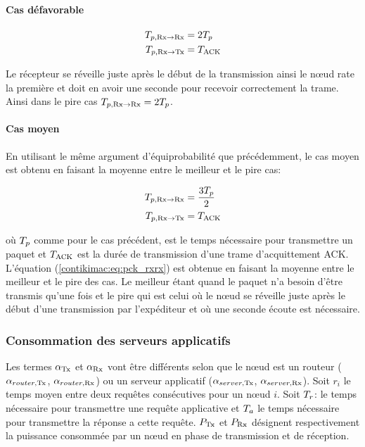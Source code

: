 \paragraph{Cas défavorable}

\begin{align}
  T_{p, \textrm{Rx} \to \textrm{Rx}} &= 2T_p
  \label{contikimac:eq:pck_rxrx_worst} \\
  T_{p, \textrm{Rx} \to \textrm{Tx}} &= T_{\textrm{ACK}}
  \label{contikimac:eq:pck_rxtx_worst}
\end{align}

Le récepteur se réveille juste après le début de la transmission ainsi le nœud rate la première et doit en avoir une seconde pour recevoir correctement la trame.
Ainsi dans le pire cas $T_{p, \textrm{Rx} \to \textrm{Rx}} = 2T_p$.

\paragraph{Cas moyen}

En utilisant le même argument d'équiprobabilité que précédemment, le cas moyen est obtenu en faisant la moyenne entre le meilleur et le pire cas:

\begin{align}
  T_{p, \textrm{Rx} \to \textrm{Rx}} &= \frac{3 T_p}{2}
  \label{contikimac:eq:pck_rxrx} \\
  T_{p, \textrm{Rx} \to \textrm{Tx}} &= T_{\textrm{ACK}}
  \label{contikimac:eq:pck_rxtx}
\end{align}

où $T_p$ comme pour le cas précédent, est le temps nécessaire pour transmettre un paquet et $T_{\textrm{ACK}}$ est la durée de transmission d'une trame d'acquittement \ac{ACK}.
L'équation (\ref{contikimac:eq:pck_rxrx}) est obtenue en faisant la moyenne entre le meilleur et le pire des cas.
Le meilleur étant quand le paquet n'a besoin d'être transmis qu'une fois et le pire qui est celui où le nœud se réveille juste après le début d'une transmission par l'expéditeur et où une seconde écoute est nécessaire.

\subsubsection{Consommation des serveurs applicatifs}

Les termes  $\alpha_{\textrm{Tx}}$ et $\alpha_{\textrm{Rx}}$ vont être différents selon que le nœud est un routeur ($\alpha_{router, \textrm{Tx}}$, $\alpha_{router, \textrm{Rx}}$) ou un serveur applicatif ($\alpha_{server, \textrm{Tx}}$, $\alpha_{server, \textrm{Rx}}$).
Soit $r_i$ le temps moyen entre deux requêtes consécutives pour un nœud $i$.
Soit $T_{r}$: le temps nécessaire pour transmettre une requête applicative et $T_{a}$ le temps nécessaire pour transmettre la réponse a cette requête.
$P_{\textrm{Tx}} $ et $P_{\textrm{Rx}}$ désignent respectivement la puissance consommée par un nœud en phase de transmission et de réception.

